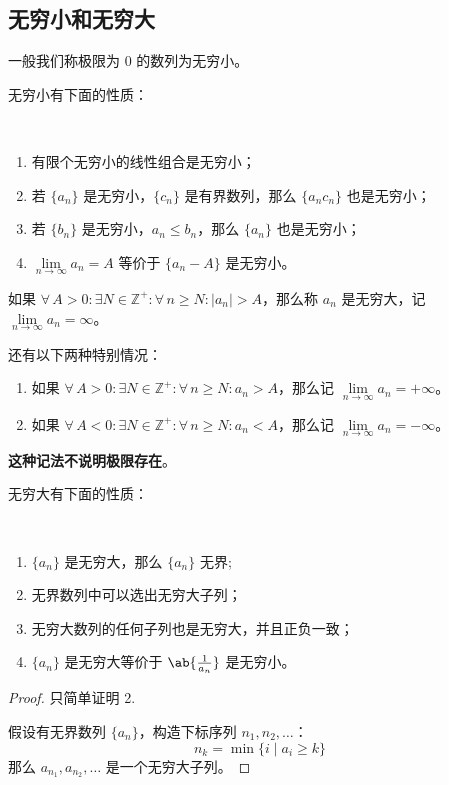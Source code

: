 \subsection{无穷小和无穷大}

\begin{definition}[无穷小]
	一般我们称极限为 $0$ 的数列为无穷小。
\end{definition}

无穷小有下面的性质：

\begin{property}[无穷小性质]
	\ 
	\begin{enumerate}
		\item 有限个无穷小的线性组合是无穷小；
		\item 若 $\{a_n\}$ 是无穷小，$\{c_n\}$ 是有界数列，那么 $\{a_n c_n\}$ 也是无穷小；
		\item 若 $\{b_n\}$ 是无穷小，$a_n \le b_n$，那么 $\{a_n\}$ 也是无穷小；
		\item $\lim\limits_{n \to \infty} a_n = A$ 等价于 $\{a_n - A\}$ 是无穷小。
	\end{enumerate}
\end{property}

\begin{definition}[无穷大]
	如果 $\forall\,A > 0: \exists N \in \mathbb{Z}^+: \forall\,n \ge N: |a_n| > A$，那么称 $a_n$ 是无穷大，记 $\lim\limits_{n \to \infty} a_n = \infty$。

	还有以下两种特别情况：

	\begin{enumerate}
		\item 如果 $\forall\,A > 0: \exists N \in \mathbb{Z}^+: \forall\,n \ge N: a_n > A$，那么记 $\lim\limits_{n \to \infty} a_n = +\infty$。
		\item 如果 $\forall\,A < 0: \exists N \in \mathbb{Z}^+: \forall\,n \ge N: a_n < A$，那么记 $\lim\limits_{n \to \infty} a_n = -\infty$。
	\end{enumerate}

	\textbf{这种记法不说明极限存在}。
\end{definition}

无穷大有下面的性质：

\begin{property}[无穷大性质]
	\ 
	\begin{enumerate}
		\item $\{a_n\}$ 是无穷大，那么 $\{a_n\}$ 无界;
		\item 无界数列中可以选出无穷大子列；
		\item 无穷大数列的任何子列也是无穷大，并且正负一致；
		\item $\{a_n\}$ 是无穷大等价于 $\ab\{\frac{1}{a_n}\}$ 是无穷小。
	\end{enumerate}

	\begin{proof}
		只简单证明 2.

		假设有无界数列 $\{a_n\}$，构造下标序列 $n_1,n_2,\dots$：
		$$
		n_k = \min\{i \mid a_i \ge k\}
		$$
		那么 $a_{n_1},a_{n_2},\dots$ 是一个无穷大子列。
	\end{proof}
\end{property}

